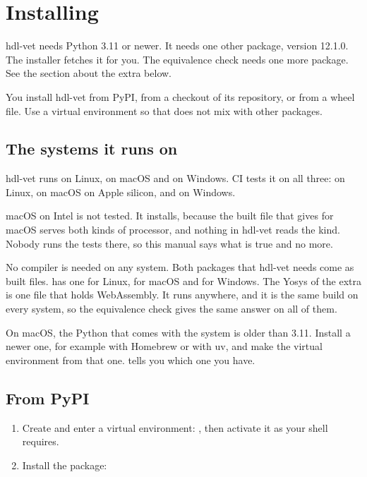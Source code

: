 \chapter{Installing}
\label{ch:install}

hdl-vet needs Python 3.11 or newer. It needs one other package, 
version 12.1.0. The installer fetches it for you. The equivalence check needs one more
package. See the section about the extra  below.

You install hdl-vet from PyPI, from a checkout of its repository, or from a
wheel file. Use a virtual environment so that  does not mix with
other packages.

\section{The systems it runs on}
\label{sec:platforms}

hdl-vet runs on Linux, on macOS and on Windows. CI tests it on all three: on Linux, on
macOS on Apple silicon, and on Windows.

macOS on Intel is not tested. It installs, because the built file that 
gives for macOS serves both kinds of processor, and nothing in hdl-vet reads the kind.
Nobody runs the tests there, so this manual says what is true and no more.

No compiler is needed on any system. Both packages that hdl-vet needs come as built
files.  has one for Linux, for macOS and for Windows. The Yosys of the
extra  is one file that holds WebAssembly. It runs anywhere, and it is the
same build on every system, so the equivalence check gives the same answer on all of
them.

On macOS, the Python that comes with the system is older than 3.11. Install a newer one,
for example with Homebrew or with uv, and make the virtual environment from that one.
 tells you which one you have.

\section{From PyPI}

\begin{enumerate}
\item Create and enter a virtual environment:
  , then activate it as your shell requires.
\item Install the package: 
\end{enumerate}

